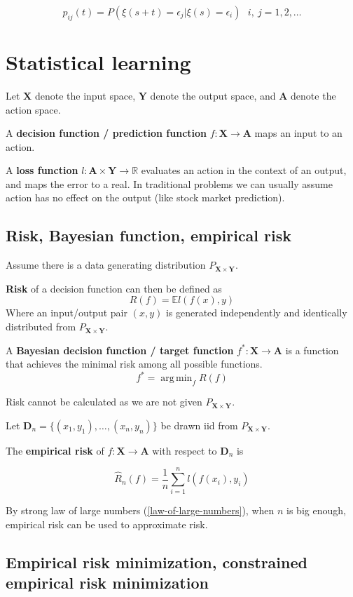 \documentclass{article}
\DeclareMathOperator*{\argmin}{arg\,min}
\begin{document}
$$
p_{ij}(t) = P(\xi(s + t) = \epsilon_j | \xi(s) = \epsilon_i) ~ ~ ~ i, ~j = 1, 2, \dots
$$

\section{Statistical learning}

Let $\mathbf{X}$ denote the input space, $\mathbf{Y}$ denote the output space, and $\mathbf{A}$ denote the action space.

A \textbf{decision function / prediction function} $f: \mathbf{X} \to \mathbf{A}$ maps an input to an action.

A \textbf{loss function} $\mathit{l}: \mathbf{A} \times \mathbf{Y} \to \mathbb{R}$ evaluates an action in the context of an output, and maps the error to a real.
In traditional problems we can usually assume action has no effect on the output (like stock market prediction).

\subsection{Risk, Bayesian function, empirical risk}

Assume there is a data generating distribution $P_{\mathbf{X} \times \mathbf{Y}}$.

\textbf{Risk} of a decision function can then be defined as
$$
R(f) = \mathbb{E}\mathit{l}(f(x), y)
$$
Where an input/output pair $(x, y)$ is generated independently and identically distributed from $P_{\mathbf{X} \times \mathbf{Y}}$.

A \textbf{Bayesian decision function / target function} $f^* : \mathbf{X} \to \mathbf{A}$ is a function that achieves the minimal risk among all possible functions.
$$
f^* = \argmin_{f}{R(f)}
$$

Risk cannot be calculated as we are not given $P_{\mathbf{X} \times \mathbf{Y}}$.

Let $\mathbf{D}_n = \{(x_1, y_1), \dots, (x_n, y_n)\}$ be drawn iid from $P_{\mathbf{X} \times \mathbf{Y}}$.

The \textbf{empirical risk} of $f : \mathbf{X} \to \mathbf{A}$ with respect to $\mathbf{D}_n$ is

$$
\hat{R}_n(f) = \frac{1}{n} \sum_{i = 1}^{n}{\mathit{l}(f(x_i), y_i)}
$$

By strong law of large numbers (\ref{law-of-large-numbers}), when $n$ is big enough, empirical risk can be used to approximate risk.

\subsection{Empirical risk minimization, constrained empirical risk minimization}
\end{document}
